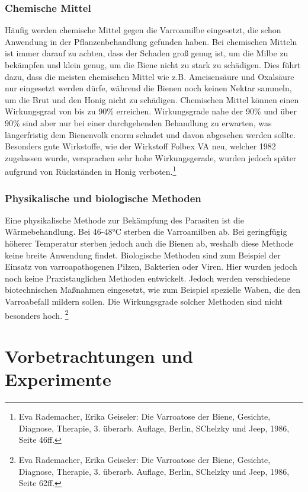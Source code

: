 \documentclass[11pt,a4paper]{article}
\begin{document}
\subsubsection{Chemische Mittel}
Häufig werden chemische Mittel gegen die Varroamilbe eingesetzt, die schon Anwendung in der Pflanzenbehandlung gefunden haben. Bei chemischen Mitteln ist immer darauf zu achten, dass der Schaden groß genug ist, um die Milbe zu bekämpfen und klein genug, um die Biene nicht zu stark zu schädigen. Dies führt dazu, dass die meisten chemischen Mittel wie z.B. Ameisensäure und Oxalsäure nur eingesetzt werden dürfe, während die Bienen noch keinen Nektar sammeln, um die Brut und den Honig nicht zu schädigen. Chemischen Mittel können einen Wirkungsgrad von bis zu 90\% erreichen. Wirkungsgrade nahe der 90\% und über 90\% sind aber nur bei einer durchgehenden Behandlung zu erwarten, was längerfristig dem Bienenvolk enorm schadet und davon abgesehen werden sollte. Besonders gute Wirkstoffe, wie der Wirkstoff Folbex VA neu, welcher 1982 zugelassen wurde, versprachen sehr hohe Wirkungsgerade, wurden jedoch später aufgrund von Rückständen in Honig verboten.\footnote{Eva Rademacher, Erika Geiseler: Die Varroatose der Biene, Gesichte, Diagnose, Therapie, 3. überarb. Auflage, Berlin, SChelzky und Jeep, 1986, Seite 46ff.}
\subsubsection{Physikalische und biologische Methoden}
Eine physikalische Methode zur Bekämpfung des Parasiten ist die Wärmebehandlung. Bei 46-48°C sterben die Varroamilben ab. Bei geringfügig höherer Temperatur sterben jedoch auch die Bienen ab, weshalb diese Methode keine breite Anwendung findet. 
Biologische Methoden sind zum Beispiel der Einsatz von varroapathogenen Pilzen, Bakterien oder Viren. Hier wurden jedoch noch keine Praxistauglichen Methoden entwickelt. Jedoch werden verschiedene biotechnischen Maßnahmen eingesetzt, wie zum Beispiel spezielle Waben, die den Varroabefall mildern sollen. Die Wirkungsgrade solcher Methoden sind nicht besonders hoch. \footnote{Eva Rademacher, Erika Geiseler: Die Varroatose der Biene, Gesichte, Diagnose, Therapie, 3. überarb. Auflage, Berlin, SChelzky und Jeep, 1986, Seite 62ff.}



\newpage
\section{Vorbetrachtungen und Experimente} \label{section:Vorbetrachtungen}
\end{document}
